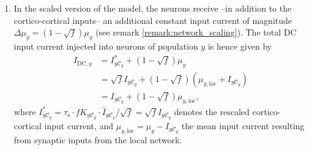 \documentclass[10pt,a4paper,twoside,american]{article}
\theoremstyle{definitionstyle}
\newcommand{\tauS}{\tau_\text{s}}
\begin{document}
\begin{appendices}
\begin{enumerate}
  In the original model of \citet{Potjans14}, the cortico-cortical inputs to neurons in population $y$ are modeled as $K_{y\mathcal{C}_{y}}$ independent realizations $s_j(t)$ ($j\in\mathcal{C}_y,\ y\in \{\mathcal{E}_{23},\ldots,\mathcal{I}_{6}\}$) of a Poisson point process with constant rate $\nu_{\mathcal{C}_y}$, filtered by an exponential kernel $\text{PSC}(t)$ with time constant $\tauS$ and amplitude $\bar{I}_{y\mathcal{C}_y}$.   
  In the implementation provided \href{https://github.com/INM-6/microcircuit-PD14-model}{here}, these Poissonian inputs are replaced by constant external currents (DC).
  DC inputs are computationally less expensive, exactly reproducible, and lead to similar network activity statistics.
  When replacing cortico-cortical input spikes $s_j(t)$ by DC inputs, the current implementation preserves the mean input current
  \begin{equation}
    I_{\mathcal{C}_y}
    = \left\langle \sum_{j=1}^{K_{y\mathcal{C}_y}} \left(s_j*\text{PSC}\right)(t) \right\rangle
    = K_{y\mathcal{C}_y} \cdot \tauS \cdot \bar{I}_{y\mathcal{C}_y} \cdot \nu_{\mathcal{C}_y} .
  \end{equation}
\item \label{remark:dc_scaling_constraints}
  In the scaled version of the model, the neurons receive --in addition to the cortico-cortical inputs-- an additional constant input current of magnitude $\Delta\mu_y = ( 1 - \sqrt{f}) \mu_y$ (see remark \ref{remark:network_scaling}).
  The total DC input current injected into neurons of population $y$ is hence given by
  \begin{equation}
    \label{eq:dc_magnitude_rescaled}
    \begin{aligned}
    I_{\text{DC},y}
    & = I_{y\mathcal{C}_y}^* + \left( 1 - \sqrt{f} \right) \mu_y\\
    & = \sqrt{f} I_{y\mathcal{C}_y} + \left( 1 - \sqrt{f} \right) \left( \mu_{y,\text{loc}} + I_{y\mathcal{C}_y}\right) \\
    & = I_{y\mathcal{C}_y} + \left( 1 - \sqrt{f} \right) \mu_{y,\text{loc}}
    ,      
    \end{aligned}
  \end{equation}
  where $I_{y\mathcal{C}_y}^* = \tauS \cdot fK_{y\mathcal{C}_y} \cdot \bar{I}_{y\mathcal{C}_y}/\sqrt{f} = \sqrt{f} I_{y\mathcal{C}_y}$ denotes the rescaled cortico-cortical input current, and  $\mu_{y,\text{loc}}=\mu_y - I_{y\mathcal{C}_y}$ the mean input current resulting from synaptic inputs from the local network.

\end{enumerate}
\end{appendices}
\end{document}
